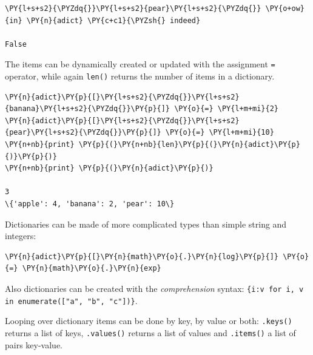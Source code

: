 \begin{tcolorbox}[breakable, size=fbox, boxrule=1pt, pad at break*=1mm, colback=cellbackground, colframe=cellborder]
\begin{Verbatim}[commandchars=\\\{\}]
\PY{l+s+s2}{\PYZdq{}}\PY{l+s+s2}{pear}\PY{l+s+s2}{\PYZdq{}} \PY{o+ow}{in} \PY{n}{adict} \PY{c+c1}{\PYZsh{} indeed}

False
\end{Verbatim}
\end{tcolorbox}

The items can be dynamically created or updated with the assignment \texttt{=} operator, while 
again \texttt{len()} returns the number of items in a dictionary.

\begin{tcolorbox}[breakable, size=fbox, boxrule=1pt, pad at break*=1mm, colback=cellbackground, colframe=cellborder]
\begin{Verbatim}[commandchars=\\\{\}]
\PY{n}{adict}\PY{p}{[}\PY{l+s+s2}{\PYZdq{}}\PY{l+s+s2}{banana}\PY{l+s+s2}{\PYZdq{}}\PY{p}{]} \PY{o}{=} \PY{l+m+mi}{2}
\PY{n}{adict}\PY{p}{[}\PY{l+s+s2}{\PYZdq{}}\PY{l+s+s2}{pear}\PY{l+s+s2}{\PYZdq{}}\PY{p}{]} \PY{o}{=} \PY{l+m+mi}{10}
\PY{n+nb}{print} \PY{p}{(}\PY{n+nb}{len}\PY{p}{(}\PY{n}{adict}\PY{p}{)}\PY{p}{)}
\PY{n+nb}{print} \PY{p}{(}\PY{n}{adict}\PY{p}{)}

3
\{'apple': 4, 'banana': 2, 'pear': 10\}
\end{Verbatim}
\end{tcolorbox}

Dictionaries can be made of more complicated types than simple string and integers:

\begin{tcolorbox}[breakable, size=fbox, boxrule=1pt, pad at break*=1mm, colback=cellbackground, colframe=cellborder]
\begin{Verbatim}[commandchars=\\\{\}]
\PY{n}{adict}\PY{p}{[}\PY{n}{math}\PY{o}{.}\PY{n}{log}\PY{p}{]} \PY{o}{=} \PY{n}{math}\PY{o}{.}\PY{n}{exp}
\end{Verbatim}
\end{tcolorbox}

Also dictionaries can be created with the \emph{comprehension} syntax: 
\texttt{\{i:v for i, v in enumerate(["a", "b", "c"])\}}.

Looping over dictionary items can be done by key, by value or both: \texttt{.keys()} returns a list of keys, \texttt{.values()} returns a list of values and \texttt{.items()} a list of pairs key-value.

